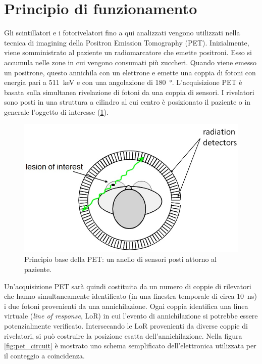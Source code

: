 \clearpage
\section{Principio di funzionamento}
Gli scintillatori e i fotorivelatori fino a qui analizzati vengono utilizzati nella tecnica di imagining della Positron Emission Tomography (PET). Inizialmente, viene somministrato al paziente un radiomarcatore che emette positroni. Esso si accumula nelle zone in cui vengono consumati più zuccheri. Quando viene emesso un positrone, questo annichila con un elettrone e emette una coppia di fotoni con energia pari a \SI{511}{\kilo\electronvolt} e con una angolazione di \SI{180}{\degree}. L'acquisizione PET è basata sulla simultanea rivelazione di fotoni da una coppia di sensori. I rivelatori sono posti in una struttura a cilindro al cui centro è posizionato il paziente o in generale l'oggetto di interesse (\Fig\ref{fig:pet}).
\begin{figure}[b!]
	\centering
	\includegraphics[width=0.7\linewidth]{./ImageFiles/PET.jpg}
	\caption{Principio base della PET: un anello di sensori posti attorno al paziente\cite{Spanoudaki2010}.}
	\label{fig:pet}
\end{figure} 
Un'acquisizione PET sarà quindi costituita da un numero di coppie di rilevatori che hanno simultaneamente identificato (in una finestra temporale di circa \SI{10}{\nano\second}) i due fotoni provenienti da una annichilazione. Ogni coppia identifica una linea virtuale (\textit{line of response}, LoR) in cui l'evento di annichilazione si potrebbe essere potenzialmente verificato. Intersecando le LoR provenienti da diverse coppie di rivelatori, si può costruire la posizione esatta dell'annichilazione. Nella figura \ref{fig:pet_circuit} è mostrato uno schema semplificato dell'elettronica utilizzata per il conteggio a coincidenza.
